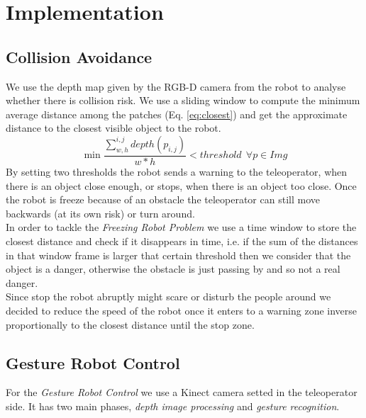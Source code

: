 \section{Implementation}
\label{sec:implementation}

\subsection{Collision Avoidance}
We use the depth map given by the RGB-D camera from the robot to analyse whether there is collision risk. We use a sliding window to compute the minimum average distance among the patches (Eq. \ref{eq:closest}) and get the approximate distance to the closest visible object to the robot. 
\begin{equation}\label{eq:closest}
\min\frac{\sum_{w,h}^{i,j}depth(p_{i,j})}{w*h} < threshold\ \ \forall p \in Img
\end{equation}
By setting two thresholds the robot sends a warning to the teleoperator, when there is an object close enough, or stops, when there is an object too close. Once the robot is freeze because of an obstacle the teleoperator can still move backwards (at its own risk) or turn around. \\

In order to tackle the \emph{Freezing Robot Problem} we use a time window to store the closest distance and check if it disappears in time, i.e. if the sum of the distances in that window frame is larger that certain threshold then we consider that the object is a danger, otherwise the obstacle is just passing by and so not a real danger.\\

Since stop the robot abruptly might scare or disturb the people around we decided to reduce the speed of the robot once it enters to a warning zone inverse proportionally to the closest distance until the stop zone. 

\subsection{Gesture Robot Control}
For the \emph{Gesture Robot Control} we use a Kinect camera setted in the teleoperator side. It has two main phases, \emph{depth image processing} and \emph{gesture recognition}.\\

